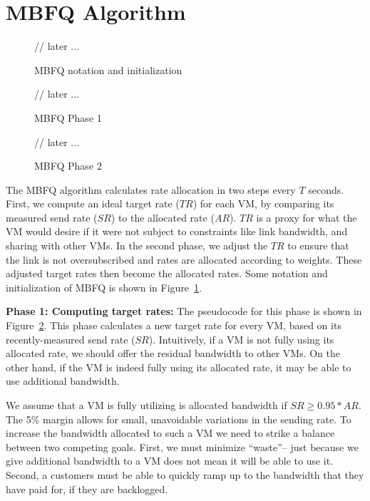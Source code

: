 \section{MBFQ Algorithm}
\label{sec:algorithm}

\begin{figure}[t]
{\footnotesize
\begin{algorithmic}
\State // later ...
\end{algorithmic}
}
\caption{MBFQ notation and initialization}
\label{fig:mbfq_init}
\end{figure}

\begin{figure}[t]
{\footnotesize
\begin{algorithmic}
\State // later ...
\end{algorithmic}
}
\caption{MBFQ Phase 1}
\label{fig:mbfq_p1}
\end{figure}

\begin{figure}[t]
{\footnotesize
\begin{algorithmic}
\State // later ...
\end{algorithmic}
}
\caption{MBFQ Phase 2}
\label{fig:mbfq_p2}
\end{figure}

The MBFQ algorithm calculates rate allocation in two steps every $T$ seconds.
First, we compute an ideal target rate ($TR$) for each VM, by comparing its
measured send rate ($SR$) to the allocated rate ($AR$). $TR$ is a proxy for what
the VM would desire if it were not subject to constraints like link bandwidth,
and sharing with other VMs.  In the second phase, we adjust the $TR$ to ensure
that the link is not oversubscribed and rates are allocated according to
weights. These adjusted target rates then become the allocated rates.  Some
notation and initialization of MBFQ is shown in Figure~\ref{fig:mbfq_init}. 

{\bf Phase 1: Computing target rates:} 
The pseudocode for this phase is shown in Figure~\ref{fig:mbfq_p1}.  This phase
calculates a new target rate for every VM, based on its recently-measured send
rate ($SR$). Intuitively, if a VM is not fully using its allocated rate, we
should offer the residual bandwidth to other VMs.  On the other hand, if the VM
is indeed fully using its allocated rate, it may be able to use additional
bandwidth. 

We assume that a VM is fully utilizing is allocated bandwidth if $SR \geq
0.95*AR$. The 5\% margin allows for small, unavoidable variations in the sending
rate. To increase the bandwidth allocated to such a VM we need to strike a
balance between two competing goals. First, we must minimize ``waste''-- just
because we give additional bandwidth to a VM does not mean it will be able to
use it. Second, a customers must be able to quickly ramp up to the bandwidth
that they have paid for, if they are backlogged.

